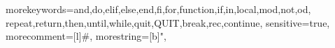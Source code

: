 
  {morekeywords={and,do,elif,else,end,fi,for,function,if,in,local,mod,not,od,%
		repeat,return,then,until,while,quit,QUIT,break,rec,continue},
  sensitive=true,
  morecomment=[l]{\#},
  morestring=[b]",
}

